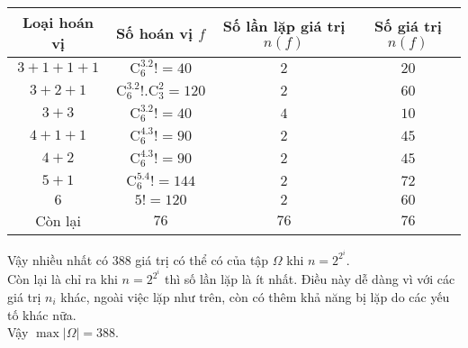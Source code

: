 \begin{bt}
{		\begin{center}
			\begin{tabular}{|c|c|c|c|}
				\hline
				\textbf{Loại hoán vị}&\textbf{Số hoán vị $f$}&\textbf{Số lần lặp giá trị $n(f)$}&\textbf{Số giá trị $n(f)$}\\ \hline
				$3+1+1+1$&$\mathrm{C}_6^3.2!=40$&$2$&$20$\\ \hline
				$3+2+1$&$\mathrm{C}_6^3.2!.\mathrm{C}_3^2=120$&$2$&$60$\\ \hline
				$3+3$&$\mathrm{C}_6^3.2!=40$&$4$&$10$\\ \hline
				$4+1+1$&$\mathrm{C}_6^4.3!=90$&$2$&$45$\\ \hline
				$4+2$&$\mathrm{C}_6^4.3!=90$&$2$&$45$\\ \hline
				$5+1$&$\mathrm{C}_6^5.4!=144$&$2$&$72$\\ \hline
				$6$&$5!=120$&$2$&$60$\\ \hline
				Còn lại&$76$&$76$&$76$\\ \hline
			\end{tabular}
		\end{center}
		Vậy nhiều nhất có $388$ giá trị có thể có của tập $\Omega$ khi $n=2^{2^i}$.\\
		Còn lại là chỉ ra khi $n=2^{2^i}$ thì số lần lặp là ít nhất. Điều này dễ dàng vì với các giá trị $n_i$ khác, ngoài việc lặp như trên, còn có thêm khả năng bị lặp do các yếu tố khác nữa.\\ Vậy  $\max \left| \Omega \right| =388$.
	}
\end{bt}


